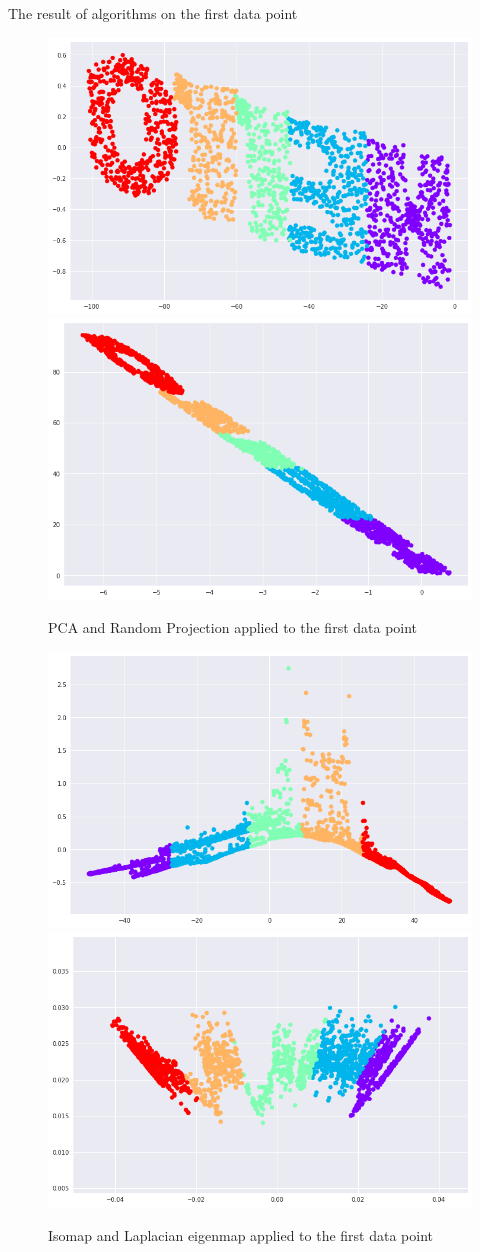 \documentclass[10pt]{beamer}
\begin{document}
\begin{frame}{The result of algorithms on the first data point}
 \begin{figure}[t]
\centering
\includegraphics[width=.4\textwidth]{pca_part1.png}\hfill
\includegraphics[width=.4\textwidth]{random_projection_part1.png}
\caption{PCA and Random Projection applied to the first data point}
\end{figure}

\begin{figure}[b]
\centering
\includegraphics[width=.4\textwidth]{Isomap_part1.png}\hfill
\includegraphics[width=.4\textwidth]{laplacian_part1.png}
\caption{Isomap and Laplacian eigenmap applied to the first data point}
\end{figure}

\end{frame}
\end{document}
